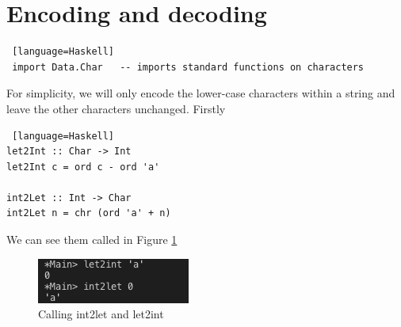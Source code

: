 \documentclass[11pt]{article}
\def\frametitle#1{}
\begin{document}
\pagebreak
\section{Encoding and decoding}
 \begin{frame}[fragile, label=encoding]
  \frametitle{Encoding and Decoding} 
   \begin{onlyenv}
  \begin{lstlisting} [language=Haskell]
 import Data.Char   -- imports standard functions on characters
  \end{lstlisting}
  \end{onlyenv}

    \pause
For simplicity, we will only encode the lower-case characters within a string and leave the other characters unchanged. 
Firstly 
  \begin{onlyenv}
  \begin{lstlisting} [language=Haskell]
let2Int :: Char -> Int
let2Int c = ord c - ord 'a' 

int2Let :: Int -> Char
int2Let n = chr (ord 'a' + n)
 \end{lstlisting}
  \end{onlyenv}
\end{frame}

\begin{frame}[fragile, label=encoding2]
 \frametitle{Encoding and Decoding contd. } 
We can see them  called in Figure \ref{int2let}
 \begin{figure} [H]

			\centering
			\includegraphics[page=1,width=.5\textwidth]{img/01.png}
				   \caption{ Calling int2let and let2int}
		   \label {int2let}
		   \end{figure}

\end{frame}
\end{document}

